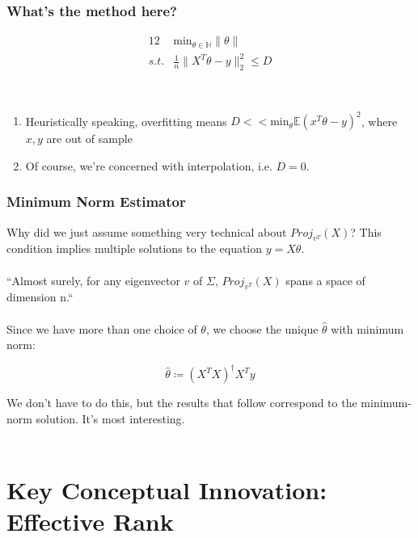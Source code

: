 \documentclass[pdf]{beamer}
\begin{document}
\begin{frame}
\frametitle{What's the method here?}
    \begin{alignat*}{12}
    & \text{min}_{\theta \in \mathbb{H}}\|\theta\| \\
     s.t. & \frac{1}{n}\|X^{T}\theta - y\|^{2}_{2} \leq D
    \end{alignat*}

\\
\begin{enumerate}
\item<3-4> Heuristically speaking, overfitting means $D << \text{min}_{\theta}\mathbb{E}(x^{T}\theta - y)^{2} $, where $x, y$ are out of sample
\item<4-4> Of course, we're concerned with interpolation, i.e. $D=0$.
\end{enumerate}

\end{frame}

\begin{frame}
\frametitle{Minimum Norm Estimator}

Why did we just assume something very technical about $Proj_{v^{T}}(X)$?  This condition implies multiple solutions to the equation $y = X\theta$.
\\~\\


``Almost surely, for any eigenvector $v$ of $\Sigma$, $Proj_{v^{T}}(X)$ spans a space of dimension n.`` \\~\\

Since we have more than one choice of $\theta$, we choose the unique $\hat\theta$ with minimum norm:

\[ \hat\theta \coloneqq (X^{T}X)^{\dagger}X^{T}y \]

  We don't have to do this, but the results that follow correspond to the minimum-norm solution.  It's most interesting. \\~\\


\end{frame}

\section{Key Conceptual Innovation: Effective Rank}
\end{document}
